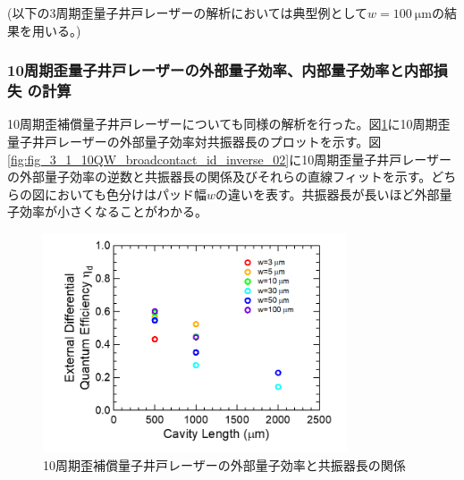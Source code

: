 {(以下の3周期歪量子井戸レーザーの解析においては典型例として$w=100\ \si{\micro\metre}$の結果を用いる。)
\clearpage
\subsubsection{10周期歪量子井戸レーザーの外部量子効率、内部量子効率と内部損失
の計算}
10周期歪補償量子井戸レーザーについても同様の解析を行った。図\ref{fig:fig_3_1_10QW_broadcontact_id_02}に10周期歪量子井戸レーザーの外部量子効率対共振器長のプロットを示す。図\ref{fig:fig_3_1_10QW_broadcontact_id_inverse_02}に10周期歪量子井戸レーザーの外部量子効率の逆数と共振器長の関係及びそれらの直線フィットを示す。どちらの図においても色分けはパッド幅$w$の違いを表す。共振器長が長いほど外部量子効率が小さくなることがわかる。

\begin{figure}[h]
	\centering
	\includegraphics[width=9cm]{figure/fig_3_1_10QW_broadcontact_id_02.png}
	\caption{10周期歪補償量子井戸レーザーの外部量子効率と共振器長の関係}
	\label{fig:fig_3_1_10QW_broadcontact_id_02}
\end{figure}

}
